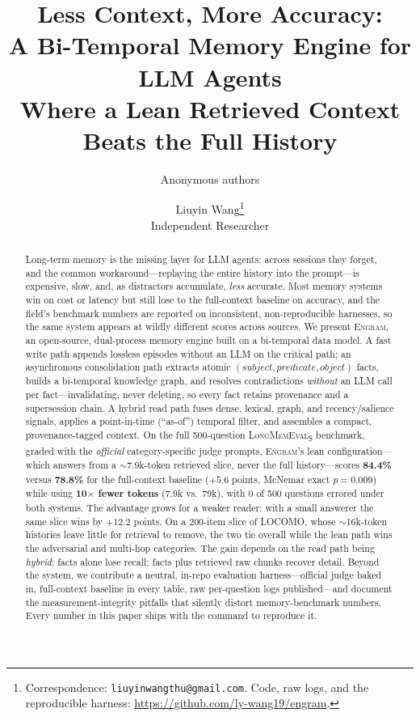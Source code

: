 \documentclass{article}
\title{Less Context, More Accuracy:\\
A Bi-Temporal Memory Engine for LLM Agents\\
Where a Lean Retrieved Context Beats the Full History}
\author{Anonymous authors}
\author{%
  Liuyin Wang\thanks{Correspondence: \texttt{liuyinwangthu@gmail.com}. Code, raw logs, and the
  reproducible harness: \url{https://github.com/ly-wang19/engram}.}\\
  Independent Researcher%
}
\newcommand{\engram}{\textsc{Engram}}
\begin{document}
\maketitle
\ificlrfinal{}\else{}\fi

\begin{abstract}
Long-term memory is the missing layer for LLM agents: across sessions they forget, and the common
workaround---replaying the entire history into the prompt---is expensive, slow, and, as distractors
accumulate, \emph{less} accurate. Most memory systems win on cost or latency but still lose to the
full-context baseline on accuracy, and the field's benchmark numbers are reported on inconsistent,
non-reproducible harnesses, so the same system appears at wildly different scores across sources.
We present \engram{}, an open-source, dual-process memory engine built on a bi-temporal data model. A fast
write path appends lossless episodes without an LLM on the critical path; an asynchronous consolidation
path extracts atomic $(\textit{subject},\textit{predicate},\textit{object})$ facts, builds a bi-temporal
knowledge graph, and resolves contradictions \emph{without} an LLM call per fact---invalidating, never
deleting, so every fact retains provenance and a supersession chain. A hybrid read path fuses dense, lexical,
graph, and recency/salience signals, applies a point-in-time (``as-of'') temporal filter, and assembles a
compact, provenance-tagged context. On the full 500-question \textsc{LongMemEval}\textsubscript{S} benchmark,
graded with the \emph{official} category-specific judge prompts, \engram{}'s lean configuration---which
answers from a $\sim$7.9k-token retrieved slice, never the full history---scores \textbf{84.4\%} versus
\textbf{78.8\%} for the full-context baseline ($+5.6$ points, McNemar exact $p=0.009$) while using
\textbf{10$\times$ fewer tokens} (7.9k vs.\ 79k), with 0 of 500 questions errored under both systems. The
advantage grows for a weaker reader: with a small answerer the same slice wins by $+12.2$ points. On a
200-item slice of LOCOMO, whose $\sim$16k-token histories leave little for retrieval to remove, the two
tie overall while the lean path wins the adversarial and multi-hop categories. The gain depends on the read
path being \emph{hybrid}: facts alone lose recall; facts plus retrieved raw chunks recover detail. Beyond the
system, we contribute a neutral, in-repo evaluation harness---official judge baked in, full-context baseline
in every table, raw per-question logs published---and document the measurement-integrity pitfalls that
silently distort memory-benchmark numbers. Every number in this paper ships with the command to reproduce it.
\end{abstract}
\end{document}
